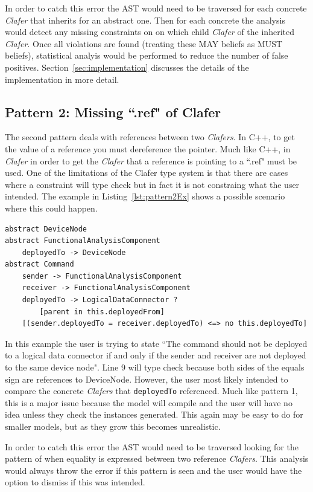 \documentclass[10pt,oneside]{IEEEtran}
\begin{document}
In order to catch this error the AST would need to be traversed for each concrete \textit{Clafer} that inherits for an abstract one. Then for each concrete the analysis would detect any missing constraints on on which child \textit{Clafer} of the inherited \textit{Clafer}. Once all violations are found (treating these MAY beliefs as MUST beliefs), statistical analyis would be performed to reduce the number of false positives. Section~\ref{sec:implementation} discusses the details of the implementation in more detail.

\subsection{Pattern 2: Missing ``.ref" of Clafer}
The second pattern deals with references between two \textit{Clafers}. In C++, to get the value of a reference you must dereference the pointer. Much like C++, in \textit{Clafer} in order to get the \textit{Clafer} that a reference is pointing to a ``.ref" must be used. One of the limitations of the Clafer type system is that there are cases where a constraint will type check but in fact it is not constraing what the user intended. The example in Listing~\ref{lst:pattern2Ex} shows a possible scenario where this could happen.
\begin{lstlisting}[label={lst:pattern2Ex},caption={Example of Pattern 2},numbers=right]
abstract DeviceNode
abstract FunctionalAnalysisComponent
    deployedTo -> DeviceNode
abstract Command
    sender -> FunctionalAnalysisComponent
    receiver -> FunctionalAnalysisComponent
    deployedTo -> LogicalDataConnector ?
        [parent in this.deployedFrom]
    [(sender.deployedTo = receiver.deployedTo) <=> no this.deployedTo]
\end{lstlisting}

In this example the user is trying to state ``The command should not be deployed to a logical data connector if and only if the sender and receiver are not deployed to the same device node". Line 9 will type check because both sides of the equals sign are references to DeviceNode. However, the user most likely intended to compare the concrete \textit{Clafers} that \lstinline$deployedTo$ referenced. Much like pattern 1, this is a major issue because the model will compile and the user will have no idea unless they check the instances generated. This again may be easy to do for smaller models, but as they grow this becomes unrealistic.

In order to catch this error the AST would need to be traversed looking for the pattern of when equality is expressed between two reference \textit{Clafers}. This analysis would always throw the error if this pattern is seen and the user would have the option to dismiss if this was intended.
\end{document}
